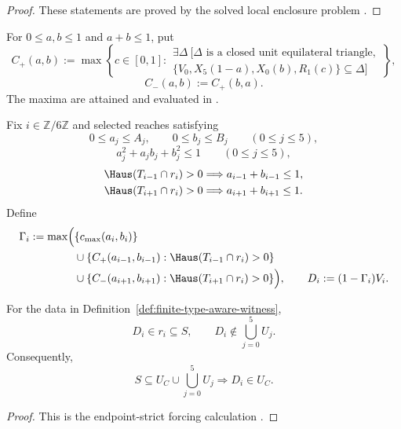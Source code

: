 \begin{proof}
These statements are proved by the solved local enclosure problem
.
\end{proof}

\begin{definition}
\label{def:finite-neighbor-capacities}
For $0\le a,b\le1$ and $a+b\le1$, put
\[
 C_+(a,b):=
 \max\left\{c\in[0,1]:
 \begin{array}{l}
 \exists\Delta\ [\Delta\text{ is a closed unit equilateral triangle},\\
 \{V_0,X_5(1-a),X_0(b),R_1(c)\}\subseteq\Delta]
 \end{array}
 \right\},
\]
\[
 C_-(a,b):=C_+(b,a).
\]
The maxima are attained and evaluated in
.
\end{definition}

\begin{definition}
\label{def:finite-type-aware-witness}
Fix $i\in\mathbb Z/6\mathbb Z$ and selected reaches satisfying
\[
 0\le a_j\le A_j,
 \qquad 0\le b_j\le B_j
 \qquad(0\le j\le5),
\]
\[
 a_j^2+a_jb_j+b_j^2\le1
 \qquad(0\le j\le5),
\]
\[
 \begin{aligned}
 \Haus(T_{i-1}\cap r_i)>0&\Longrightarrow a_{i-1}+b_{i-1}\le1,\\
 \Haus(T_{i+1}\cap r_i)>0&\Longrightarrow a_{i+1}+b_{i+1}\le1.
 \end{aligned}
\]
Define
\[
\begin{aligned}
 \Gamma_i:=\max\Bigl(&\{c_{\max}(a_i,b_i)\}\\
 &\cup\{C_+(a_{i-1},b_{i-1}):\Haus(T_{i-1}\cap r_i)>0\}\\
 &\cup\{C_-(a_{i+1},b_{i+1}):\Haus(T_{i+1}\cap r_i)>0\}\Bigr),
 \qquad D_i:=(1-\Gamma_i)V_i.
\end{aligned}
\]
\end{definition}

\begin{lemma}
\label{lem:new-type-aware-radial-forcing}
For the data in Definition~\ref{def:finite-type-aware-witness},
\[
 D_i\in r_i\subseteq S,
 \qquad D_i\notin\bigcup_{j=0}^5U_j.
\]
Consequently,
\[
 S\subseteq U_C\cup\bigcup_{j=0}^5U_j
 \Longrightarrow D_i\in U_C.
\]
\end{lemma}

\begin{proof}
This is the endpoint-strict forcing calculation
.
\end{proof}

